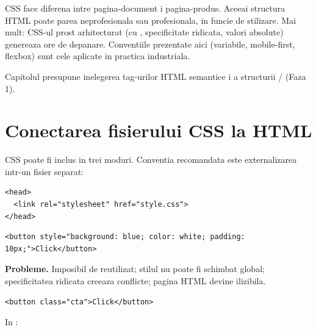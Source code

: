 \begin{whymatters}
CSS face diferena intre pagina-document i pagina-produs. Aceeai structura HTML poate parea neprofesionala sau profesionala, in funcie de stilizare. Mai mult: CSS-ul prost arhitecturat (cu , specificitate ridicata, valori absolute) genereaza ore de depanare. Conventiile prezentate aici (variabile, mobile-first, flexbox) sunt cele aplicate in practica industriala.
\end{whymatters}

\begin{nota}
Capitolul presupune inelegerea tag-urilor HTML semantice i a structurii / (Faza 1).
\end{nota}

\section{Conectarea fisierului CSS la HTML}

CSS poate fi inclus in trei moduri. Conventia recomandata este externalizarea intr-un fisier separat:

\begin{lstlisting}[style=html, caption={Stilurile externe (recomandat)}]
<head>
  <link rel="stylesheet" href="style.css">
</head>
\end{lstlisting}

\begin{dano}
\begin{lstlisting}[style=html, numbers=none]
<button style="background: blue; color: white; padding: 10px;">Click</button>
\end{lstlisting}
\textbf{Probleme.} Imposibil de reutilizat; stilul nu poate fi schimbat global; specificitatea ridicata creeaza conflicte; pagina HTML devine ilizibila.
\end{dano}

\begin{dado}
\begin{lstlisting}[style=html, numbers=none]
<button class="cta">Click</button>
\end{lstlisting}
In : 
\end{dado}

